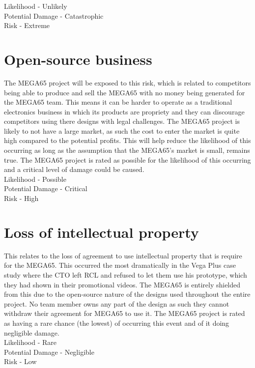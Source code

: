 Likelihood - Unlikely \\
Potential Damage - Catastrophic \\
Risk - Extreme \\


\section{Open-source business}
The MEGA65 project will be exposed to this risk, which is related to competitors being able to produce and sell the MEGA65 with no money being generated for the MEGA65 team. This means it can be harder to operate as a traditional electronics business in which its products are propriety and they can discourage competitors using there designs with legal challenges. The MEGA65 project is likely to not have a large market, as such the cost to enter the market is quite high compared to the potential profits. This will help reduce the likelihood of this occurring as long as the assumption that the MEGA65's market is small, remains true. The MEGA65 project is rated as possible for the likelihood of this occurring and a critical level of damage could be caused. \\

Likelihood - Possible \\
Potential Damage - Critical \\
Risk - High \\


\section{Loss of intellectual property}
This relates to the loss of agreement to use intellectual property that is require for the MEGA65. This occurred the most dramatically in the Vega Plus case study where the CTO left RCL and refused to let them use his prototype, which they had shown in their promotional videos. The MEGA65 is entirely shielded from this due to the open-source nature of the designs used throughout the entire project. No team member owns any part of the design as such they cannot withdraw their agreement for MEGA65 to use it. The MEGA65 project is rated as having a rare chance (the lowest) of occurring this event and of it doing negligible damage.  \\

Likelihood - Rare \\
Potential Damage - Negligible \\
Risk - Low \\


